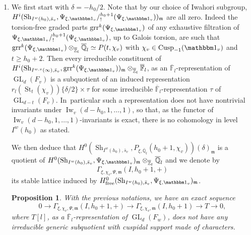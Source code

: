 \documentclass[JEP,XML,SOM,Unicode,published]{cedram}
\let\mathds\mathbbm
\newenvironment{enumeratea}
{\bgroup\def\theenumi{\alph{enumi}}\begin{enumerate}}
{\end{enumerate}\egroup}
\newcommand{\NoChangel}[1]{%
\expandafter\let\csname old\string#1\endcsname=#1
\let#1=\relax
\newcommand{#1}{\mathcode`l="716C\csname old\string#1\endcsname\mathcode`l="7160 }%
}
\DeclareMathOperator{\GL}{GL}
\newcommand{\free}{\mathrm{free}}
\theoremstyle{plain}
\newtheorem{prop}[equation]{Proposition}
\theoremstyle{definition}
\numberwithin{equation}{subsection}
\newcommand\Fm{{\mathbb F}}
\newcommand\Qm{{\mathbb Q}}
\newcommand\Zm{{\mathbb Z}}
\DeclareMathOperator{\sh}{Sh}
\DeclareMathOperator{\cusp}{Cusp}
\DeclareMathOperator{\Iw}{Iw}
\DeclareMathOperator{\st}{St}
\DeclareMathOperator{\grr}{grr}
\DeclareMathOperator{\Fil}{Fil}\NoChangel{\Fil}
\let \oo=\infty
\begin{document}
\begin{enumeratea}
\item
We first start with $\delta=-h_0/2$. Note that by our choice of Iwahori
subgroup,
$H^i(\sh_{I^w(h_0),\bar s_v},\Psi_{\xi,\mathds 1_v}/\Fil^{h_0+1}_!
(\Psi_{\xi,\mathds 1_v}))_{\mathfrak m}$
are all zero. Indeed the torsion-free graded parts $\grr^k(\Psi_{\xi,\mathds 1_v})$
of any exhaustive filtration of
$\Psi_{\xi,\mathds 1_v} / \Fil^{h_0+1}_!(\Psi_{\xi,\mathds 1_v})$, up to Galois torsion, are such that
$\grr^k(\Psi_{\xi,\mathds 1_v}) \otimes_{\overline \Zm_l} \overline \Qm_l \simeq P(t,\chi_v)$
with $\chi_v \in \cusp_{-1}(\mathds 1_v)$ and $t \geq h_0+2$. Then
every irreducible constituent of
$H^i(\sh_{I^{w,v}(\oo),\bar s_v},\grr^k(\Psi_{\xi,\mathds 1_v}))_{\mathfrak m}
\otimes_{\overline \Zm_l} \overline \Fm_l$,
as an $\overline \Fm_l$-representation of $\GL_d(F_v)$ is a subquotient of an induced
representation
$r_l(\st_t(\chi_v))\{\delta/2\} \times \tau$ for some irreducible $\overline \Fm_l$-representation
$\tau$ of $\GL_{d-t}(F_v)$. In~particular such a representation does not have nontrivial invariants under \hbox{$\Iw_v(d-h_0,1,\dots,1)$}, so that, as the functor of
$\Iw_v(d-h_0,1,\dots,1)$-invariants is exact,
there is no cohomology in level $I^w(h_0)$ as stated.

We then deduce that
$H^0(\sh_{I^w(h_0),\bar s_v},P_{\xi,\overline \Qm_l}(h_0+1,\chi_v))(\delta)_{\mathfrak m}$
is a quotient of
$H^0(\sh_{I^w(h_0),\bar s_v},\Psi_{\xi,\mathds 1_v})_{\mathfrak m}
\otimes_{\overline \Zm_l} \overline \Qm_l$
and we denote by
\[
\Gamma_{\xi,\chi_v,\Psi,\mathfrak m}(I,h_0+1,+)
\]
its stable lattice induced by
$H^0_{\free}(\sh_{I^w(h_0),\bar s_v},\Psi_{\xi,\mathds 1_v})_{\mathfrak m}$.

\begin{prop} \label{prop-lattice-psi}
With the previous notations, we have an exact sequence
\[
0 \to \Gamma_{\xi,\chi_v,\Psi,\mathfrak m}(I,h_0+1,+)
\to \Gamma_{\xi,\chi_v,\mathfrak m}(I,h_0+1) \to T
\to 0,
\]
where $T[l]$, as a $\overline{\mathbb F}_l$-representation of $\GL_d(F_w)$,
does not have any irreducible generic subquotient with cuspidal support
made of characters.
\end{prop}


\end{enumeratea}
\end{document}
